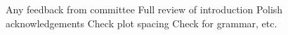 Any feedback from committee
Full review of introduction
Polish acknowledgements
Check plot spacing
Check for grammar, etc.